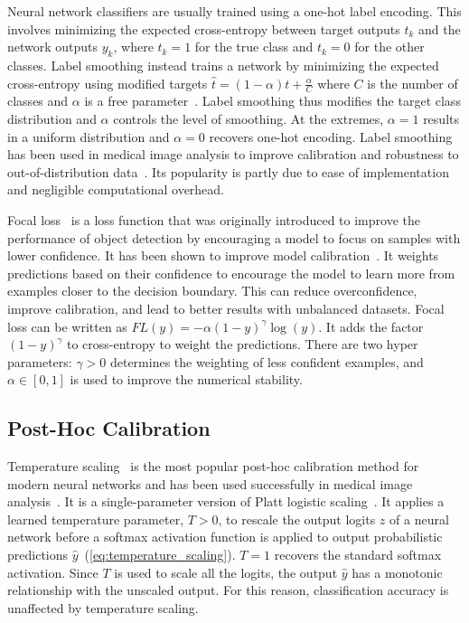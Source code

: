 Neural network classifiers are usually trained using a one-hot label encoding. This involves minimizing the expected cross-entropy between target outputs $t_k$ and the network outputs $y_k$, where $t_k=1$ for the true class and $t_k=0$ for the other classes. Label smoothing instead trains a network by minimizing the expected cross-entropy using modified targets $\hat{t} = (1 - \alpha) t + \frac{\alpha}{C}$ where $C$ is the number of classes and $\alpha$ is a free parameter~\citep{szegedy2016rethinking}. Label smoothing thus modifies the target class distribution and $\alpha$ controls the level of smoothing. At the extremes, $\alpha = 1$ results in a uniform distribution and $\alpha = 0$ recovers one-hot encoding. Label smoothing has been used in medical image analysis to improve calibration and robustness to out-of-distribution data~\citep{islam2021spatially}. Its popularity is partly due to ease of implementation and negligible computational overhead. 

Focal loss~\citep{lin2017focal} is a loss function that was originally introduced to improve the performance of object detection by encouraging a model to focus on samples with lower confidence. It has been shown to improve model calibration~\citep{mukhoti2020calibrating}. It weights predictions based on their confidence to encourage the model to learn more from examples closer to the decision boundary. This can reduce overconfidence, improve calibration, and lead to better results with unbalanced datasets. Focal loss can be written as $FL(y) = -\alpha(1-y)^\gamma\log(y)$. It adds the factor $(1-y)^\gamma$ to cross-entropy to weight the predictions. There are two hyper parameters: $\gamma>0$ determines the weighting of less confident examples, and $\alpha \in [0, 1]$ is used to improve the numerical stability.


\subsection{Post-Hoc Calibration}
Temperature scaling~\citep{guo2017calibration} is the most popular post-hoc calibration method for modern neural networks and has been used successfully in medical image analysis~\citep{liang2020improved}. It is a single-parameter version of Platt logistic scaling~\citep{platt1999probabilistic}. It applies a learned temperature parameter, $T > 0$, to rescale the output logits $z$ of a neural network before a softmax activation function is applied to output probabilistic predictions $\hat{y}$~(\ref{eq:temperature_scaling}). $T=1$ recovers the standard softmax activation. Since $T$ is used to scale all the logits, the output $\hat{y}$ has a monotonic relationship with the unscaled output. For this reason, classification accuracy is unaffected by temperature scaling.

